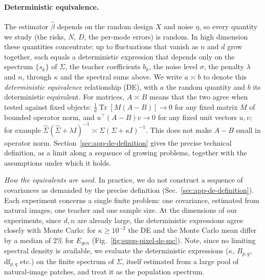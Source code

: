 \paragraph{Deterministic equivalence.}
The estimator $\hat\beta$ depends on the random design $X$ and
noise $\eta$, so every quantity we study (the risks, $N$, $D$, the per-mode
errors) is random.  In high dimension these quantities concentrate: up to
fluctuations that vanish as $n$ and $d$ grow together, each equals a
deterministic expression that depends only on the spectrum $\{s_k\}$ of
$\Sigma$, the teacher coefficients $b_k$, the noise level $\sigma$, the penalty
$\lambda$ and $n$, through $\kappa$ and the spectral sums above.  We write $a\asymp b$ to denote this \textit{deterministic equivalence} relationship (DE), with $a$ the random quantity and $b$ its deterministic
equivalent.  
For matrices, $A\asymp B$ means that the two agree when tested against fixed objects: $\tfrac1d\operatorname{Tr}[M(A-B)]\to0$ for any fixed matrix $M$ of bounded operator norm, and $u^\top(A-B)v\to0$ for any fixed unit vectors $u,v$; 
for example $\hat\Sigma(\hat\Sigma+\lambda I)^{-1}\asymp\Sigma(\Sigma+\kappa I)^{-1}$. 
This does not make $A-B$ small in operator norm.
Section~\ref{sec:app-de-definition} gives the precise technical definition, as a limit along a sequence of growing problems, together with the assumptions under which it holds.

\emph{How the equivalents are used.}   
In practice, we do not construct a sequence of covariances as demanded by the precise definition (Sec.~\ref{sec:app-de-definition}). Each experiment concerns a single finite problem: one covariance, estimated from natural images, one teacher and one sample size.
At the dimensions of our experiments, since $d,n$ are already large, the deterministic expressions agree closely with Monte Carlo:
for $\kappa\ge10^{-2}$ the DE and the Monte Carlo mean differ by a median of 2\% for $E_{gen}$ (Fig.~\ref{fig:supp-pixel-de-mc}).
Note, since no limiting spectral density is available, we evaluate the deterministic expressions ($\kappa$, $B_{p,q}$, $\mathrm{df}_{p,q}$ etc.) on the finite spectrum of $\Sigma$, itself estimated from a large pool of natural-image patches, and treat it as the population spectrum.

